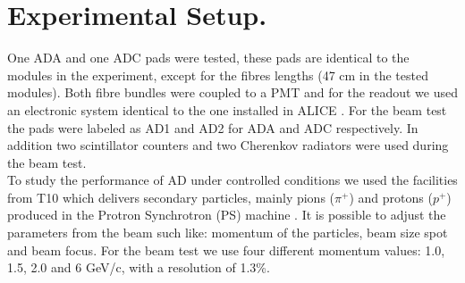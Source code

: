 \section{Experimental Setup.} \label{cap:ExpSetup}

One ADA and one ADC pads were tested, these pads are identical to the modules 
in the experiment, except for the fibres lengths (47 cm in the tested modules). 
Both fibre bundles were coupled to a PMT and for the readout we used an 
electronic system identical to the one installed in ALICE \cite{Zoccarato}. %
For the beam test the pads were labeled as AD1 and AD2 for ADA and ADC 
respectively. In addition two scintillator counters and two Cherenkov  
radiators were used during the beam test. %
\\
To study the performance of AD under controlled conditions we used the 
facilities from T10 \cite{t10BeamArea} which delivers secondary particles, 
mainly pions ($\pi^{+}$) and protons ($p^{+}$) produced in the Protron 
Synchrotron (PS) machine \cite{Simon:PS,psBeam}. It is possible to adjust the 
parameters from the beam such like: momentum of the particles, beam size spot 
and beam focus. For the beam test we use four different momentum values: 1.0, 
1.5, 2.0 and 6 GeV/c, with a resolution of 1.3\%.

